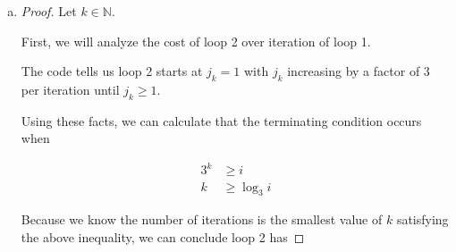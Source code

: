\documentclass[12pt]{article}
\begin{document}
\begin{enumerate}[a.]
\begin{proof}
        \bigskip

        Then, because we know $d_2 = 2$, we can conclude

        \begin{align}
            \log_b (f(n)) &\leq d_2 \cdot \log_b (g(n))
        \end{align}
    \end{proof}

    \textbf{Notes:}

    \begin{itemize}
        \item $\forall x,y \in \mathbb{R}^{+}, x \geq y \Leftrightarrow \log x \geq \log y$


        \item $\exists c_1,c_2,n_0 \in \mathbb{R}^{+},\:\forall n \in \mathbb{N},
        n \geq n_0 \Rightarrow c_1 \cdot g(n) \leq f(n) \leq c2 \cdot g(n)$

        \item \textbf{Definition of Eventually:} $\exists n_0 \in \mathbb{N},
        n \geq n_0 \Rightarrow P$, where $P:\mathbb{N} \to \{\text{True},\text{False}\}$
    \end{itemize}

    \item

    \begin{proof}
        Let $k \in \mathbb{N}$.

        \bigskip

        First, we will analyze the cost of loop 2 over iteration of loop 1.

        \bigskip

        The code tells us loop 2 starts at $j_k = 1$ with $j_k$ increasing by
        a factor of 3 per iteration until $j_k \geq 1$.

        \bigskip

        Using these facts, we can calculate that the terminating condition occurs
        when

        \setcounter{equation}{0}
        \begin{align}
            3^k &\geq i\\
            k &\geq \log_3 i
        \end{align}

        \bigskip

        Because we know the number of iterations is the smallest value of $k$
        satisfying the above inequality, we can conclude loop 2 has


\end{proof}
\end{enumerate}
\end{document}
